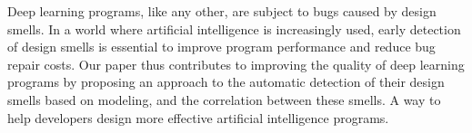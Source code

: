 \label{sec:conclusion}

Deep learning programs, like any other, are subject to bugs caused by design smells. In a world where artificial intelligence is increasingly used, early detection of design smells is essential to improve program performance and reduce bug repair costs. Our paper thus contributes to improving the quality of deep learning programs by proposing an approach to the automatic detection of their design smells based on modeling, and the correlation between these smells. A way to help developers design more effective artificial intelligence programs.